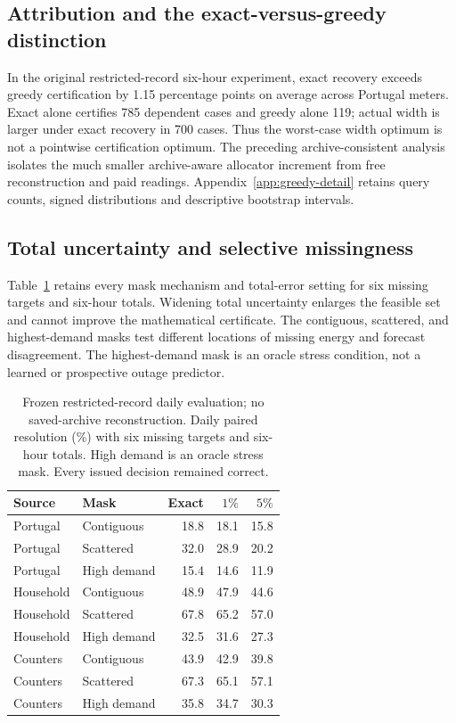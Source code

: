 \documentclass[12pt]{article}
\begin{document}
\subsection{Attribution and the exact-versus-greedy distinction}
In the original restricted-record six-hour experiment, exact recovery exceeds
greedy certification by 1.15 percentage points on average across Portugal
meters. Exact alone certifies 785 dependent cases and greedy alone 119;
actual width is larger under exact recovery in 700 cases. Thus the worst-case
width optimum is not a pointwise certification optimum.
The preceding archive-consistent analysis isolates the much smaller
archive-aware allocator increment from free reconstruction and paid readings.
Appendix~\ref{app:greedy-detail} retains query counts, signed distributions
and descriptive bootstrap intervals.


\subsection{Total uncertainty and selective missingness}
Table~\ref{tab:sensitivity} retains every mask mechanism and total-error
setting for six missing targets and six-hour totals. Widening total
uncertainty enlarges the feasible set and cannot improve the mathematical
certificate. The contiguous, scattered, and highest-demand masks test
different locations of missing energy and forecast disagreement. The
highest-demand mask is an oracle stress condition, not a learned or
prospective outage predictor.
\begin{table}[htbp]
\centering\normalsize\setlength{\tabcolsep}{4pt}
\caption{Frozen restricted-record daily evaluation; no saved-archive reconstruction. Daily paired resolution (\%) with six missing targets and six-hour totals. High demand is an oracle stress mask. Every issued decision remained correct.}
\label{tab:sensitivity}
\begin{tabular}{llrrr}
\toprule
Source & Mask & Exact & $1\%$ & $5\%$\\
\midrule
Portugal & Contiguous & 18.8 & 18.1 & 15.8\\
Portugal & Scattered & 32.0 & 28.9 & 20.2\\
Portugal & High demand & 15.4 & 14.6 & 11.9\\
Household & Contiguous & 48.9 & 47.9 & 44.6\\
Household & Scattered & 67.8 & 65.2 & 57.0\\
Household & High demand & 32.5 & 31.6 & 27.3\\
Counters & Contiguous & 43.9 & 42.9 & 39.8\\
Counters & Scattered & 67.3 & 65.1 & 57.1\\
Counters & High demand & 35.8 & 34.7 & 30.3\\
\bottomrule
\end{tabular}
\end{table}
\end{document}
